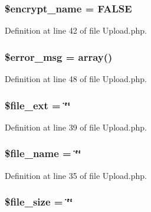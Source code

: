 \subsubsection[{\$encrypt\-\_\-name}]{\setlength{\rightskip}{0pt plus 5cm}\$encrypt\-\_\-name = F\-A\-L\-S\-E}\label{class_c_i___upload_a54a751add0762edd4da11373e3b56687}


Definition at line 42 of file Upload.\-php.

\subsubsection[{\$error\-\_\-msg}]{\setlength{\rightskip}{0pt plus 5cm}\$error\-\_\-msg = array()}\label{class_c_i___upload_acf910733622c1fa671b9f755c69c2ec7}


Definition at line 48 of file Upload.\-php.

\subsubsection[{\$file\-\_\-ext}]{\setlength{\rightskip}{0pt plus 5cm}\$file\-\_\-ext = \char`\"{}\char`\"{}}\label{class_c_i___upload_a65b080519869bc14d792c1800e3362f5}


Definition at line 39 of file Upload.\-php.

\subsubsection[{\$file\-\_\-name}]{\setlength{\rightskip}{0pt plus 5cm}\$file\-\_\-name = \char`\"{}\char`\"{}}\label{class_c_i___upload_a59bf132c77b5bee5adff2098cc2a6fbc}


Definition at line 35 of file Upload.\-php.

\subsubsection[{\$file\-\_\-size}]{\setlength{\rightskip}{0pt plus 5cm}\$file\-\_\-size = \char`\"{}\char`\"{}}\label{class_c_i___upload_a5b3595a69dbf686d879bd009ec9c0317}


